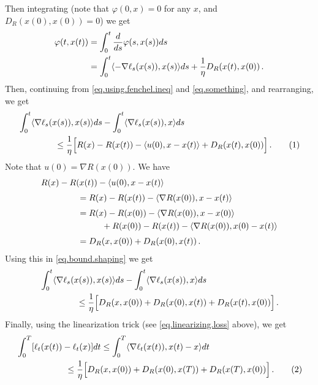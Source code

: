 \documentclass[12pt]{article}
\theoremstyle{plain}
\theoremstyle{definition}
\theoremstyle{remark}
\begin{document}
Then integrating
(note that $\varphi(0,x) = 0$ for any $x$, and $D_{R}(x(0), x(0)) = 0$) 
we get
\begin{align*}
\varphi(t,x(t)) 
&= \int_{0}^{t} \frac{d}{ds} \varphi(s,x(s)) ds \\
&= \int_{0}^{t} \langle {-\nabla\ell_{s}(x(s)), x(s)}\rangle ds 
     + \frac{1}{\eta} D_{R}(x(t), x(0)) \,.
\end{align*}
Then, continuing from \eqref{eq.using.fenchel.ineq} and \eqref{eq.something},
and rearranging, we get
\begin{align*}
&\int_{0}^{t} \ab{\nabla\ell_{s}(x(s)), x(s)} ds - \int_{0}^{t} \ab{\nabla\ell_{s}(x(s)), x} ds \\
&\hspace{1.5cm}
\leq \frac{1}{\eta} \Bigl[ R(x) - R(x(t)) - \ab{u(0), x - x(t)} + D_{R}(x(t), x(0)) \Bigr]\,.
\addtocounter{equation}{1}
\label{eq.bound.shaping}  \tag{\theequation}
\end{align*}
Note that $u(0) = \nabla R(x(0))$. We have
\begin{align*}
&R(x) - R(x(t)) - \langle {u(0), x - x(t)}\rangle \\[1mm]
&\hspace{1.5cm}
= R(x) - R(x(t)) - \langle {\nabla R(x(0)), x - x(t)}\rangle \\[1mm]
&\hspace{1.5cm}
= R(x) - R(x(0)) - \langle {\nabla R(x(0)), x - x(0)}\rangle \\
&\hspace{2.5cm}
   + R(x(0)) - R(x(t)) - \langle {\nabla R(x(0)), x(0) - x(t)}\rangle \\[1mm]
&\hspace{1.5cm}
= D_{R}(x,x(0)) + D_{R}(x(0),x(t))\,.
\end{align*}
Using this in \eqref{eq.bound.shaping} we get
\begin{align*}
&\int_{0}^{t} \langle {\nabla\ell_{s}(x(s)), x(s)}\rangle ds - \int_{0}^{t} \langle {\nabla\ell_{s}(x(s)), x}\rangle ds \\
&\hspace{1.5cm}
\leq \frac{1}{\eta} \Bigl[ D_{R}(x,x(0)) + D_{R}(x(0),x(t)) + D_{R}(x(t), x(0)) \Bigr]\,.
\end{align*}
Finally, using the linearization trick (see \eqref{eq.linearizing.loss} above), we get
\begin{align*}
&\int_{0}^{T} [\ell_{t}(x(t)) - \ell_{t}(x)] dt
\leq \int_{0}^{T} \ab{\nabla\ell_{t}(x(t)), x(t) - x} dt \\
&\hspace{2.0cm}
\leq \frac{1}{\eta} \Bigl[ D_{R}(x,x(0)) + D_{R}(x(0),x(T)) + D_{R}(x(T), x(0)) \Bigr]\,.
\addtocounter{equation}{1}
\label{eq.bound.new}  \tag{\theequation}
\end{align*}
\end{document}
